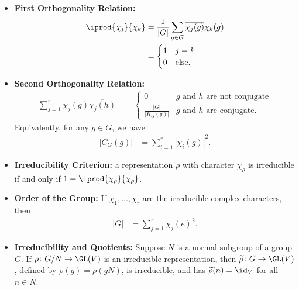 \documentclass[10pt]{mypackage}
\begin{document}
\begin{itemize}
    The one-dimensional characters $\chi\colon G\rightarrow \C^{\times}$ descend to a map on the abelianization $\chi\colon G/\left[ G,G \right]\rightarrow \C^{\times}$. The group of one-dimensional characters with pointwise multiplication is isomorphic to the abelianization $G/\left[ G,G \right]$.
  \item \textbf{First Orthogonality Relation:}
    \begin{align*}
      \iprod{\chi_j}{\chi_k} &= \frac{1}{\left\vert G \right\vert} \sum_{g\in G} \overline{\chi_j(g)}\chi_k(g)\\
                             &= \begin{cases}
                               1 & j = k\\
                               0 & \text{else}.
                             \end{cases}
    \end{align*}
  \item \textbf{Second Orthogonality Relation:}
    \begin{align*}
      \sum_{j=1}^{r} \chi_j(g) \overline{\chi_j(h)} &= \begin{cases}
        0 & \text{$g$ and $h$ are not conjugate}\\
        \frac{\left\vert G \right\vert}{\left\vert K_G(g) \right\vert} & \text{$g$ and $h$ are conjugate}.
      \end{cases}
    \end{align*}
    Equivalently, for any $g\in G$, we have
    \begin{align*}
      \left\vert C_G(g) \right\vert &= \sum_{i=1}^{r} \left\vert \chi_i\left( g \right) \right\vert^2.
    \end{align*}
  \item \textbf{Irreducibility Criterion:} a representation $\rho$ with character $\chi_{\rho}$ is irreducible if and only if $1 = \iprod{\chi_{\rho}}{\chi_{\rho}}$.
  \item \textbf{Order of the Group:} If $\chi_1,\dots,\chi_r$ are the irreducible complex characters, then
    \begin{align*}
      \left\vert G \right\vert &= \sum_{j=1}^{r} \chi_j\left(e\right)^2.
    \end{align*}
  \item \textbf{Irreducibility and Quotients:} Suppose $N$ is a normal subgroup of a group $G$. If $\rho\colon G/N\rightarrow \GL(V)$ is an irreducible representation, then $ \widetilde{\rho}\colon G\rightarrow \GL(V) $, defined by $ \widetilde{\rho}(g) = \rho(gN) $, is irreducible, and has $ \widetilde{\rho}(n) = \id_V $ for all $n\in N$.

\end{itemize}
\end{document}
